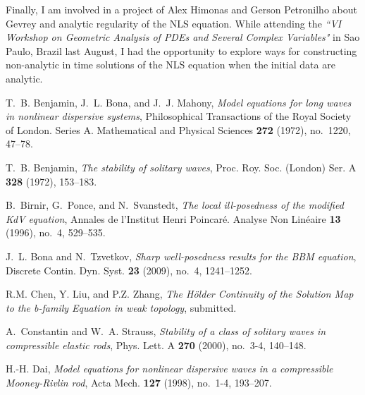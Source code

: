 \documentclass[12pt,reqno]{amsart}
\begin{document}
Finally, I am involved in a project of Alex Himonas and Gerson Petronilho about
Gevrey and analytic regularity of the NLS equation.  While attending the {\em
    ``VI Workshop on Geometric Analysis of PDEs and Several Complex Variables"}
\/in Sao Paulo, Brazil last August, I had the opportunity to explore ways for
constructing non-analytic in time solutions of the NLS equation when the initial
data are analytic. 
\providecommand{\bysame}{\leavevmode\hbox to3em{\hrulefill}\thinspace}
\providecommand{\MR}{\relax\ifhmode\unskip\space\fi MR }
\providecommand{\MRhref}[2]{%
  \href{http://www.ams.org/mathscinet-getitem?mr=#1}{#2}
}
\providecommand{\href}[2]{#2}
\begin{thebibliography}{dLKT07}

T.~B. Benjamin, J.~L. Bona, and J.~J. Mahony, \emph{{Model equations for long
  waves in nonlinear dispersive systems}}, Philosophical Transactions of the
  Royal Society of London. Series A. Mathematical and Physical Sciences
  \textbf{272} (1972), no.~1220, 47--78.

T.~B. Benjamin, \emph{{The stability of solitary waves}}, Proc. Roy. Soc.
  (London) Ser. A \textbf{328} (1972), 153--183.

B.~Birnir, G.~Ponce, and N.~Svanstedt, \emph{{The local ill-posedness of the
  modified KdV equation}}, Annales de l'Institut Henri Poincar{\'e}. Analyse
  Non Lin{\'e}aire \textbf{13} (1996), no.~4, 529--535.

J.~L. Bona and N.~Tzvetkov, \emph{{Sharp well-posedness results for the BBM
  equation}}, Discrete Contin. Dyn. Syst. \textbf{23} (2009), no.~4,
  1241--1252.

R.M. Chen, Y. Liu, and P.Z. Zhang, \emph{{The H{\"o}lder Continuity of the Solution Map to the
  b-family Equation in weak topology}}, submitted.

A.~Constantin and W.~A. Strauss, \emph{{Stability of a class of solitary waves
  in compressible elastic rods}}, Phys. Lett. A \textbf{270} (2000), no.~3-4,
  140--148.

H.-H. Dai, \emph{{Model equations for nonlinear dispersive waves in a
  compressible Mooney-Rivlin rod}}, Acta Mech. \textbf{127} (1998), no.~1-4,
  193--207.


\end{thebibliography}
\end{document}
